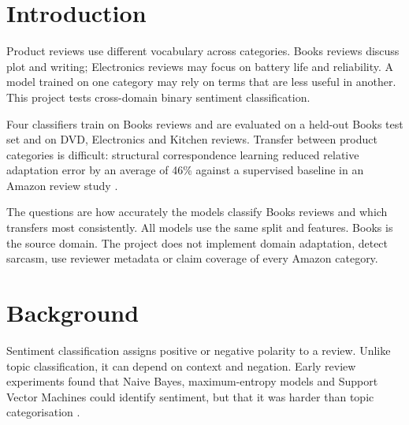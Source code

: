 \documentclass[11pt,a4paper]{article}
\begin{document}
\begin{abstract}
This project tests whether sentiment models trained on Amazon Books reviews transfer to DVD, Electronics and Kitchen reviews. It compares Logistic Regression and Linear Support Vector Machine with a Deep Neural Network and a Residual Multi-Layer Perceptron. The official balanced binary version of the Johns Hopkins Multi-Domain Sentiment Dataset is used. Each model is evaluated in a baseline and refined form. Accuracy, precision, recall, F1-score and ROC-AUC are reported for a held-out Books test set and three unseen product domains. The Deep Neural Network obtains the highest refined mean target-domain F1-score (0.779), while Logistic Regression has the smallest source-to-target F1 gap (0.060). All four models show a performance drop outside Books.
\end{abstract}

\section{Introduction}
Product reviews use different vocabulary across categories. Books reviews discuss plot and writing; Electronics reviews may focus on battery life and reliability. A model trained on one category may rely on terms that are less useful in another. This project tests cross-domain binary sentiment classification.

Four classifiers train on Books reviews and are evaluated on a held-out Books test set and on DVD, Electronics and Kitchen reviews. Transfer between product categories is difficult: structural correspondence learning reduced relative adaptation error by an average of 46\% against a supervised baseline in an Amazon review study \cite{blitzer}.

The questions are how accurately the models classify Books reviews and which transfers most consistently. All models use the same split and features. Books is the source domain. The project does not implement domain adaptation, detect sarcasm, use reviewer metadata or claim coverage of every Amazon category.

\section{Background}
Sentiment classification assigns positive or negative polarity to a review. Unlike topic classification, it can depend on context and negation. Early review experiments found that Naive Bayes, maximum-entropy models and Support Vector Machines could identify sentiment, but that it was harder than topic categorisation \cite{pang}.
\end{document}
